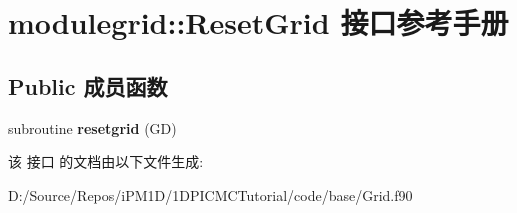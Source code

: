 \hypertarget{interfacemodulegrid_1_1_reset_grid}{}\section{modulegrid\+::Reset\+Grid 接口参考手册}
\label{interfacemodulegrid_1_1_reset_grid}
\subsection*{Public 成员函数}
\begin{DoxyCompactItemize}
\item 
\mbox{\label{interfacemodulegrid_1_1_reset_grid_a37cd9bcfd0f0f3ec49a52aebcff4b8e3}} 
subroutine {\bfseries resetgrid} (GD)
\end{DoxyCompactItemize}


该 接口 的文档由以下文件生成\+:\begin{DoxyCompactItemize}
\item 
D\+:/\+Source/\+Repos/i\+P\+M1\+D/1\+D\+P\+I\+C\+M\+C\+Tutorial/code/base/Grid.\+f90\end{DoxyCompactItemize}
